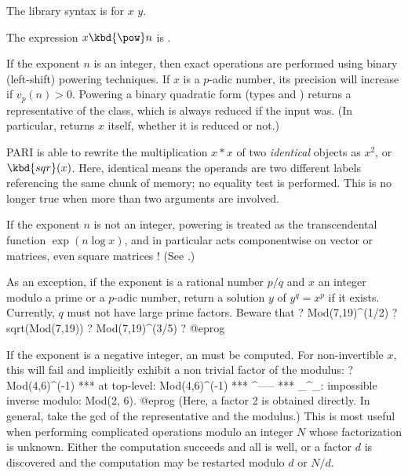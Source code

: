 The library syntax is 
for $x$ \kbd{\%} $y$.

\subseckbd{\pow} The expression $x\hbox{\kbd{\pow}}n$ is .

\item If the exponent $n$ is an integer, then exact operations are performed
using binary (left-shift) powering techniques. If $x$ is a $p$-adic number, its
precision will increase if $v_p(n) > 0$. Powering a binary quadratic form
(types  and ) returns a representative of the class, which is
always reduced if the input was. (In particular,  returns $x$
itself, whether it is reduced or not.)

PARI is able to rewrite the multiplication $x * x$ of two \emph{identical}
objects as $x^2$, or $\kbd{sqr}(x)$. Here, identical means the operands are
two different labels referencing the same chunk of memory; no equality test
is performed. This is no longer true when more than two arguments are
involved.

\item If the exponent $n$ is not an integer, powering is treated as the
transcendental function $\exp(n\log x)$, and in particular acts
componentwise on vector or matrices, even square matrices ! (See
.)

\item As an exception, if the exponent is a rational number $p/q$ and $x$ an
integer modulo a prime or a $p$-adic number, return a solution $y$ of
$y^q=x^p$ if it exists. Currently, $q$ must not have large prime factors.
Beware that
\bprog
? Mod(7,19)^(1/2)
? sqrt(Mod(7,19))
? Mod(7,19)^(3/5)
? %
@eprog

\item If the exponent is a negative integer, an  must be computed.
For non-invertible  $x$, this will fail and implicitly exhibit a
non trivial factor of the modulus:
\bprog
? Mod(4,6)^(-1)
  ***   at top-level: Mod(4,6)^(-1)
  ***                         ^-----
  *** _^_: impossible inverse modulo: Mod(2, 6).
@eprog\noindent
(Here, a factor 2 is obtained directly. In general, take the gcd of the
representative and the modulus.) This is most useful when performing
complicated operations modulo an integer $N$ whose factorization is
unknown. Either the computation succeeds and all is well, or a factor $d$
is discovered and the computation may be restarted modulo $d$ or $N/d$.

